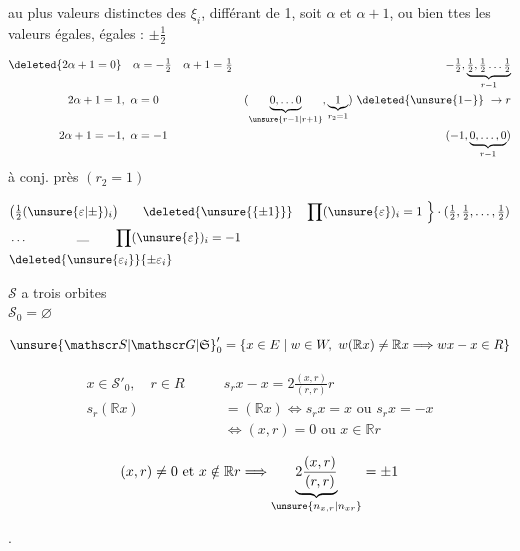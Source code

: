 au plus  valeurs distinctes des $\xi_i$, différant de 1, soit $\alpha$ et $\alpha+1$,  ou bien ttes les valeurs égales, égales : $\pm\frac12$

\[
\begin{aligned}
\deleted{2\alpha+1=0}&\quad\alpha=-\tfrac12\quad\alpha+1=\tfrac12
&-\tfrac12,\underbrace{\tfrac12,\tfrac12\ldots\tfrac12}_{r-1}\\
2\alpha+1=1&,\ \alpha=0&(\underbrace{0,\ldots0}_{\unsure{r-1|r+1}},\underbrace{1}_{r_2=1})\ \deleted{\unsure{1-}}\ \to r\\
2\alpha+1=-1&,\ \alpha=-1&(-1,\underbrace{0,\ldots,0}_{r-1})
\end{aligned}
\]
\quad à conj. près $(r_2=1)$

\[
\begin{aligned}
&\bigl(\tfrac12(\unsure{\varepsilon|\pm})_i\bigr)\qquad
\deleted{\unsure{\{\pm1\}}}\quad\prod(\unsure{\varepsilon})_i=1
\ \Big\}\cdot(\tfrac12,\tfrac12,\ldots,\tfrac12)\\
&\ldots\qquad\qquad\rule{1em}{.3pt}\qquad\prod(\unsure{\varepsilon})_i=-1\\
&\deleted{\unsure{\varepsilon_i}}\{\pm\varepsilon_i\}
\end{aligned}
\]

 $\mathscr S$ a trois orbites\\ $\mathscr S_0=\varnothing$ 


\[
\unsure{\mathscr S|\mathscr G|\mathfrak S}'_0=\{x\in E\mid w\in W,\ w(\mathbb R x)\ne\mathbb R x\Longrightarrow wx-x\in R\}
\]

\[
\begin{aligned}
x\in\mathscr S'_0,\quad r\in R\qquad&s_rx-x=2\frac{(x,r)}{(r,r)}r\\
s_r(\mathbb R x)&=(\mathbb R x)\Longleftrightarrow s_rx=x\text{ ou }s_rx=-x\\
&\Longleftrightarrow (x,r)=0\text{ ou }x\in\mathbb R r
\end{aligned}
\]

\[(x,r)\ne0\text{ et }x\notin\mathbb R r\Longrightarrow\underbrace{2\frac{(x,r)}{(r,r)}}_{\unsure{n_{x,r}|n_{x r}}}=\pm1\]

\quad .



